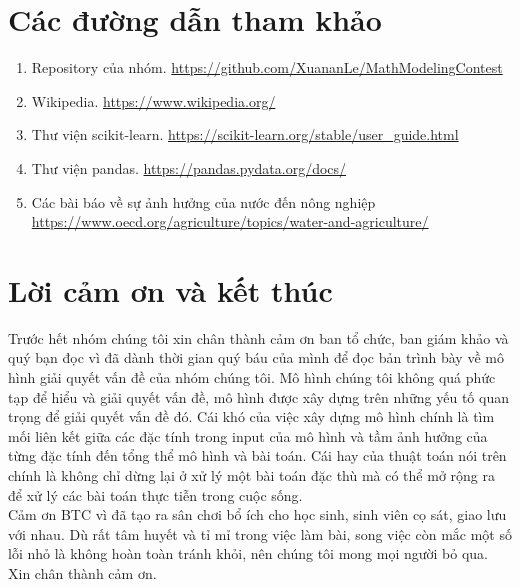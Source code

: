 \documentclass[12pt]{report}
\begin{document}
\chapter{Các đường dẫn tham khảo} %
\label{cha:các_đường_dẫn_tham_khảo}
\begin{flushleft}
	\begin{enumerate}
		\item Repository của nhóm. \url{https://github.com/XuananLe/MathModelingContest}

		\item Wikipedia. \url{https://www.wikipedia.org/}

		\item Thư viện scikit-learn. \url{https://scikit-learn.org/stable/user_guide.html}

		\item Thư viện pandas. \url{https://pandas.pydata.org/docs/}

		\item Các bài báo về sự ảnh hưởng của nước đến nông nghiệp \url{https://www.oecd.org/agriculture/topics/water-and-agriculture/}
	\end{enumerate}
\end{flushleft}

\chapter*{Lời cảm ơn và kết thúc}
\begin{flushleft}
	Trước hết nhóm chúng tôi xin chân thành cảm ơn ban tổ chức, ban giám khảo và quý bạn đọc vì đã dành thời gian quý báu của mình để đọc bản trình bày về mô hình giải quyết vấn đề của nhóm chúng tôi. Mô hình chúng tôi không quá phức tạp để hiểu và giải quyết vấn đề, mô hình được xây dựng trên những yếu tố quan trọng để giải quyết vấn đề đó. Cái khó của việc xây dựng mô hình chính là tìm mối liên kết giữa các đặc tính trong input của mô hình và tầm ảnh hưởng của từng đặc tính đến tổng thể mô hình và bài toán. Cái hay của thuật toán nói trên chính là không chỉ dừng lại ở xử lý một bài toán đặc thù mà có thể mở rộng ra để xử lý các bài toán thực tiễn trong cuộc sống.
	\\[\baselineskip]

	Cảm ơn BTC vì đã tạo ra sân chơi bổ ích cho học sinh, sinh viên cọ sát, giao lưu với nhau. Dù rất tâm huyết và tỉ mỉ trong việc làm bài, song việc còn mắc một số lỗi nhỏ là không hoàn toàn tránh khỏi, nên chúng tôi mong mọi người bỏ qua.
	\\[\baselineskip]

	Xin chân thành cảm ơn.
\end{flushleft}
\end{document}
